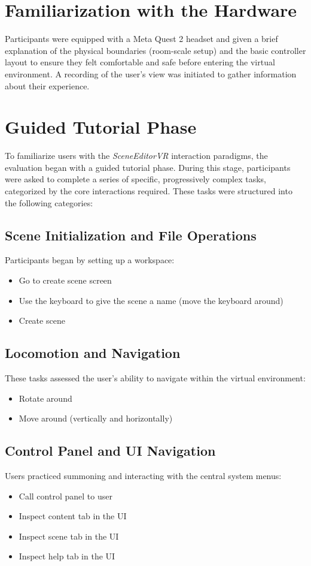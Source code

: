 \documentclass[inscr,ack,preface]{dithesis}
\begin{document}
\section{Familiarization with the Hardware}
Participants were equipped with a Meta Quest 2 headset and given a brief explanation of the physical boundaries
(room-scale setup) and the basic controller layout to ensure they felt comfortable and safe before entering the virtual environment. A recording of the user's view was initiated to gather information about their experience.

\section{Guided Tutorial Phase}
To familiarize users with the \textit{SceneEditorVR} interaction paradigms, the evaluation began with a guided tutorial phase.
During this stage, participants were asked to complete a series of specific, progressively complex tasks, categorized by the core interactions required.
These tasks were structured into the following categories:

\subsection{Scene Initialization and File Operations}
Participants began by setting up a workspace:
\begin{itemize}
  \item Go to create scene screen
  \item Use the keyboard to give the scene a name (move the keyboard around)
  \item Create scene
\end{itemize}

\subsection{Locomotion and Navigation}
These tasks assessed the user's ability to navigate within the virtual environment:
\begin{itemize}
  \item Rotate around
  \item Move around (vertically and horizontally)
\end{itemize}

\subsection{Control Panel and UI Navigation}
Users practiced summoning and interacting with the central system menus:
\begin{itemize}
  \item Call control panel to user
  \item Inspect content tab in the UI
  \item Inspect scene tab in the UI
  \item Inspect help tab in the UI
\end{itemize}
\end{document}
